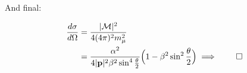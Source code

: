 \documentclass[11pt]{article}
\begin{document}
And final:

\begin{equation}
  \begin{split}
    \frac{d\sigma}{d\Omega} & = \frac{|{\cal{M}}|^2} {4 (4 \pi)^2 m_\mu^2} \\
    & = \frac{\alpha^2} {4 |\textbf{p}|^2 \beta^2 \sin^4 \frac{\theta} {2}}
      \Big ( 1 - \beta^2 \sin^2 \frac {\theta} {2} \Big ) \implies \qed
  \end{split}
\end{equation}
\end{document}
